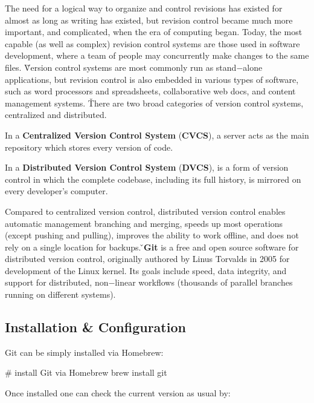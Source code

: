 The need for a logical way to organize and control revisions has existed for almost as long as writing has existed,
but revision control became much more important, and complicated, when the era of computing began. Today, the most
capable (as well as complex) revision control systems are those used in software development, where a team of people
may concurrently make changes to the same files. \v

Version control systems are most commonly run as stand$-$alone applications, but revision control is also embedded in
various types of software, such as word processors and spreadsheets, collaborative web docs, and content management
systems. \v

There are two broad categories of version control systems, centralized and distributed.

In a \textbf{Centralized Version Control System} (\textbf{CVCS}), a server acts as the main repository which stores
every version of code.
\ed

In a \textbf{Distributed Version Control System} (\textbf{DVCS}), is a form of version control in which the complete
codebase, including its full history, is mirrored on every developer's computer.
\ed

Compared to centralized version control, distributed version control enables automatic management branching and
merging, speeds up most operations (except pushing and pulling), improves the ability to work offline, and does not
rely on a single location for backups. \v

\bd[Git]
\textbf{Git} is a free and open source software for distributed version control, originally authored by Linus
Torvalds in 2005 for development of the Linux kernel. Its goals include speed, data integrity, and support for
distributed, non$-$linear workflows (thousands of parallel branches running on different systems).
\ed

\subsection{Installation \& Configuration}

Git can be simply installed via Homebrew:

\begin{bash}
# install Git via Homebrew
brew install git
\end{bash}

Once installed one can check the current version as usual by:

